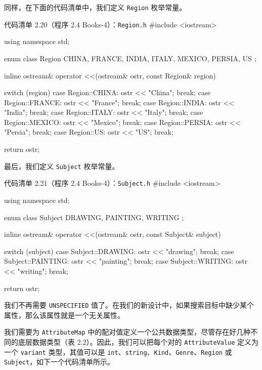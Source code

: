 同样，在下面的代码清单中，我们定义 \texttt{Region} 枚举常量。

\begin{codeboxt}{代码清单 2.20（程序 2.4 Books-4）：\texttt{Region.h}}
#include <iostream>

using namespace std;

enum class Region
{
    CHINA, FRANCE, INDIA, ITALY, MEXICO, PERSIA, US
};

inline ostream& operator <<(ostream& ostr, const Region& region)
{
    switch (region)
    {
        case Region::CHINA:  ostr << "China";  break;
        case Region::FRANCE: ostr << "France"; break;
        case Region::INDIA:  ostr << "India";  break;
        case Region::ITALY:  ostr << "Italy";  break;
        case Region::MEXICO: ostr << "Mexico"; break;
        case Region::PERSIA: ostr << "Persia"; break;
        case Region::US:     ostr << "US";     break;
    }

    return ostr;
}
\end{codeboxt}

最后，我们定义 \texttt{Subject} 枚举常量。

\begin{codeboxt}{代码清单 2.21（程序 2.4 Books-4）：\texttt{Subject.h}}
#include <iostream>

using namespace std;

enum class Subject
{
    DRAWING, PAINTING, WRITING
};

inline ostream& operator <<(ostream& ostr, const Subject& subject)
{
    switch (subject)
    {
        case Subject::DRAWING:  ostr << "drawing";  break;
        case Subject::PAINTING: ostr << "painting"; break;
        case Subject::WRITING:  ostr << "writing";  break;
    }

    return ostr;
}
\end{codeboxt}

我们不再需要 \texttt{UNSPECIFIED} 值了。在我们的新设计中，如果搜索目标中缺少某个属性，那么该属性就是一个无关属性。

我们需要为 \texttt{Attribute\allowbreak{}Map} 中的配对值定义一个公共数据类型，尽管存在好几种不同的底层数据类型（表 2.2）。因此，我们可以把每个对的 \texttt{Attribute\allowbreak{}Value} 定义为一个 \texttt{variant} 类型，其值可以是 \texttt{int}、\texttt{string}、\texttt{Kind}、\texttt{Genre}、\texttt{Region} 或 \texttt{Subject}，如下一个代码清单所示。

